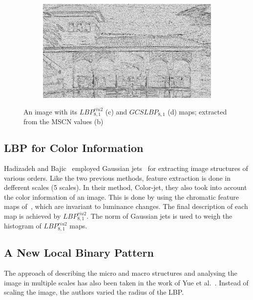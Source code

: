 \begin{figure}
\begin{subfigure}[b]{0.3\textwidth}
         \caption{}
         \label{fig:gcslbp-riu2}
     \end{subfigure}
     \hfill
     \begin{subfigure}[b]{0.3\textwidth}
         \centering
         \includegraphics[width= \textwidth]{./figs/gcs_mscn}
         \caption{}
         \label{fig:gcslbp-gcs}
     \end{subfigure}
     \caption{An image with its $LBP_{8, 1}^{riu2}$ (c) and $GCSLBP_{8, 1}$ (d) maps; extracted from the MSCN values (b)}
        \label{fig:gcslbp}
\end{figure}
\subsection{LBP for Color Information}
Hadizadeh and Bajic~\cite{Hadizadeh2016} employed Gaussian jets~\cite{Griffin2007} for extracting image structures of various orders. Like the two previous methods, feature extraction is done in defferent scales (5 scales). In their method, Color-jet, they also took into account the color information of an image. This is done by using the chromatic feature maps of~\cite{VanDeWeijer2006}, which are invariant to luminance changes. The final description of each map is achieved by $LBP_{8,1}^{riu2}$. The norm of Gaussian jets is used to weigh the histogram of $LBP_{8,1}^{riu2}$ maps.
\subsection{A New Local Binary Pattern}
The approach of describing the micro and macro structures and analysing the image in multiple scales has also been taken in the work of Yue et al.~\cite{Yue2018}. Instead of scaling the image, the authors varied the radius of the LBP.

